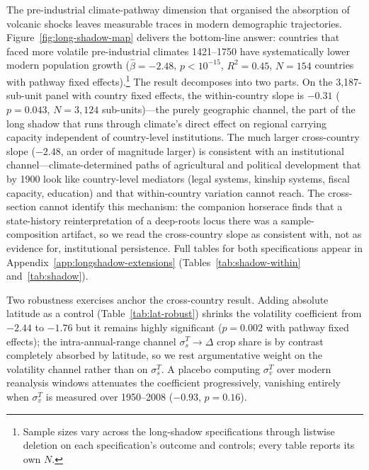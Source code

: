 \documentclass[11pt,letterpaper]{article}
\begin{document}
The pre-industrial climate-pathway dimension that organised the absorption of volcanic shocks leaves measurable traces in modern demographic trajectories. Figure~\ref{fig:long-shadow-map} delivers the bottom-line answer: countries that faced more volatile pre-industrial climates 1421--1750 have systematically lower modern population growth ($\hat\beta = -2.48$, $p < 10^{-15}$, $R^2 = 0.45$, $N=154$ countries with pathway fixed effects).\footnote{Sample sizes vary across the long-shadow specifications through listwise deletion on each specification's outcome and controls; every table reports its own $N$.} The result decomposes into two parts. On the 3{,}187-sub-unit panel with country fixed effects, the within-country slope is $-0.31$ ($p = 0.043$, $N=3{,}124$ sub-units)---the purely geographic channel, the part of the long shadow that runs through climate's direct effect on regional carrying capacity independent of country-level institutions. The much larger cross-country slope ($-2.48$, an order of magnitude larger) is consistent with an institutional channel---climate-determined paths of agricultural and political development that by 1900 look like country-level mediators (legal systems, kinship systems, fiscal capacity, education) and that within-country variation cannot reach. The cross-section cannot identify this mechanism: the companion horserace \citep{alonso_horserace_v3} finds that a state-history reinterpretation of a deep-roots locus there was a sample-composition artifact, so we read the cross-country slope as consistent with, not as evidence for, institutional persistence. Full tables for both specifications appear in Appendix~\ref{app:longshadow-extensions} (Tables~\ref{tab:shadow-within} and~\ref{tab:shadow}).

Two robustness exercises anchor the cross-country result. Adding absolute latitude as a control (Table~\ref{tab:lat-robust}) shrinks the volatility coefficient from $-2.44$ to $-1.76$ but it remains highly significant ($p = 0.002$ with pathway fixed effects); the intra-annual-range channel $\sigma_s^T \to \Delta$ crop share is by contrast completely absorbed by latitude, so we rest argumentative weight on the volatility channel rather than on $\sigma_s^T$. A placebo computing $\sigma_v^T$ over modern reanalysis windows attenuates the coefficient progressively, vanishing entirely when $\sigma_v^T$ is measured over 1950--2008 ($-0.93$, $p=0.16$).
\end{document}

